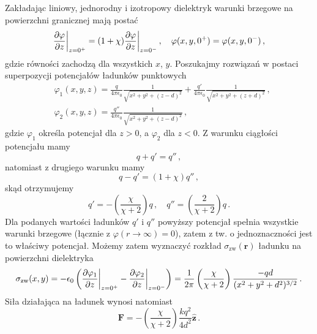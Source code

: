 \documentclass[../main.tex]{subfiles}
\begin{document}
\begin{enumerate}
    Zakładając liniowy, jednorodny i izotropowy dielektryk warunki brzegowe na powierzchni granicznej mają postać
    \begin{equation*}
        \pdv{\varphi}{z}\bigg|_{z=0^+}=(1+\chi)\pdv{\varphi}{z}\bigg|_{z=0^-}\,,\quad \varphi(x,y,0^+)=\varphi(x,y,0^-)\,,
    \end{equation*}
    gdzie równości zachodzą dla wszystkich \(x\), \(y\). Poszukajmy rozwiązań w postaci superpozycji potencjałów ładunków punktowych
    \begin{equation*}
        \begin{split}
            &\varphi_1(x,y,z)=\frac{q}{4\pi\epsilon_0}\frac{1}{\sqrt{x^2+y^2+(z-d)^2}}+\frac{q'}{4\pi\epsilon_0}\frac{1}{\sqrt{x^2+y^2+(z+d)^2}}\,,\\
            &\varphi_2(x,y,z)=\frac{q''}{4\pi\epsilon_0}\frac{1}{\sqrt{x^2+y^2+(z-d)^2}}\,,
        \end{split}
    \end{equation*}
    gdzie \(\varphi_1\) określa potencjał dla \(z>0\), a \(\varphi_2\) dla \(z<0\). Z warunku ciągłości potencjału mamy
    \begin{equation*}
        q+q'=q''\,,
    \end{equation*}
    natomiast z drugiego warunku mamy
    \begin{equation*}
        q-q'=(1+\chi)q''\,,
    \end{equation*}
    skąd otrzymujemy
    \begin{equation*}
        q'=-\left(\frac{\chi}{\chi+2}\right)q\,,\quad q''=\left(\frac{2}{\chi+2}\right)q\,.
    \end{equation*}
    Dla podanych wartości ładunków \(q'\) i \(q''\) powyższy potencjał spełnia wszystkie warunki brzegowe (łącznie z \(\varphi(r\to\infty)=0\)), zatem z tw. o jednoznaczności jest to właściwy potencjał. Możemy zatem wyznaczyć rozkład \(\sigma_\text{zw}(\mathbf{r})\) ładunku na powierzchni dielektryka
    \begin{equation*}
        \sigma_\text{zw}(x,y)=-\epsilon_0\left(\pdv{\varphi_1}{z}\bigg|_{z=0^+}-\pdv{\varphi_2}{z}\bigg|_{z=0^-}\right)=\frac{1}{2\pi}\left(\frac{\chi}{\chi+2}\right)\frac{-qd}{(x^2+y^2+d^2)^{3/2}}\,.
    \end{equation*}
   Siła działająca na ładunek wynosi natomiast
    \begin{equation*}
        \mathbf{F}=-\left(\frac{\chi}{\chi+2}\right)\frac{kq^2}{4d^2}\mathbf{\hat{z}}\,.
    \end{equation*}
    

\end{enumerate}
\end{document}
